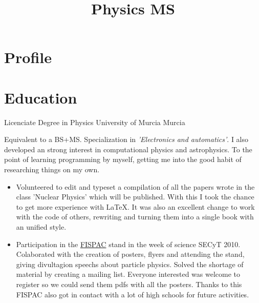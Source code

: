 \documentclass[11pt,a4paper,roman]{moderncv}
\title{Physics MS}
\begin{document}
\maketitle



\section{Profile}

\section{Education}

	{Licenciate Degree in Physics}
	{University of Murcia}
	{Murcia}
	{}
	{Equivalent to a BS+MS. Specialization in \textit{'Electronics and automatics'}.
	 I also developed an strong interest in computational physics and astrophysics. 
	 To the point of learning programming by myself, getting me into the good habit 
	 of researching things on my own.
	\begin{itemize}
		\item Volunteered to edit and typeset a compilation of all the papers wrote in 
	the class 'Nuclear Physics' which will be published. With this I took the chance 
	to get more experience with \LaTeX. It was also an excellent change to work with
	the code of others, rewriting and turning them into a single book with an unified
	style.
		\item Participation in the \href{http://www.um.es/fispac/}{FISPAC} stand in the 
	week of science SECyT 2010. Colaborated with the creation of posters, flyers and 	
	attending the stand, giving divultagion speechs about particle physics.
	Solved the shortage of material by creating a mailing list. Everyone interested 
	was welcome to register so we could send them pdfs with all the posters. Thanks 
	to this FISPAC also got in contact with a lot of high schools for future 
	activities.
	\end{itemize}	
	}
\end{document}
